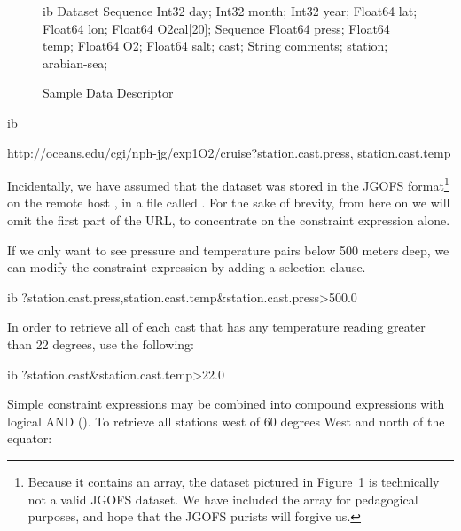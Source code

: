\begin{figure}[htbf]
\begin{vcode}{ib}
Dataset {
   Sequence{
      Int32 day;
      Int32 month;
      Int32 year;
      Float64 lat;
      Float64 lon;
      Float64 O2cal[20];
      Sequence{
         Float64 press;
         Float64 temp;
         Float64 O2;
         Float64 salt;
      } cast;
      String comments;
   } station;
} arabian-sea;
\end{vcode}
\label{opd-client,fig,dds}
\caption{Sample Data Descriptor}
\end{figure}

\begin{vcode}{ib}

http://oceans.edu/cgi/nph-jg/exp1O2/cruise?station.cast.press,
                                           station.cast.temp
\end{vcode}


Incidentally, we have assumed that the dataset was stored in the
JGOFS format\footnote{Because it contains an array, the dataset
  pictured in Figure~\ref{opd-client,fig,dds} is technically not a
  valid JGOFS dataset. We have included the array for pedagogical
  purposes, and hope that the JGOFS purists will forgive us.}  on the
remote host , in a file called .
For the sake of brevity, from here on we will omit the first part of
the URL, to concentrate on the constraint expression alone.

If we only want to see pressure and temperature pairs below 500 meters
deep, we can modify the constraint expression by adding a selection
clause.

\begin{vcode}{ib}
?station.cast.press,station.cast.temp&station.cast.press>500.0
\end{vcode}

In order to retrieve all of each cast that has any temperature reading
greater than 22 degrees, use the following:

\begin{vcode}{ib}
?station.cast&station.cast.temp>22.0
\end{vcode}

Simple constraint expressions may be combined into compound
expressions with logical AND (\lit{\ind{\&}}). To retrieve all
stations west of 60 degrees West and north of the equator:
  


